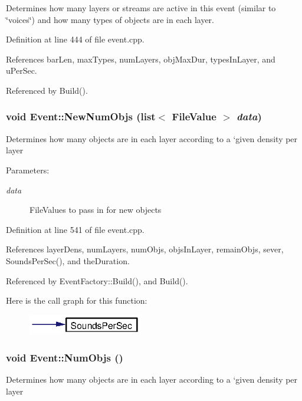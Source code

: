 Determines how many layers or streams are active in this event (similar to \char`\"{}voices\char`\"{}) and how many types of objects are in each layer. 

Definition at line 444 of file event.cpp.

References bar\-Len, max\-Types, num\-Layers, obj\-Max\-Dur, types\-In\-Layer, and u\-Per\-Sec.

Referenced by Build().
\subsubsection{\setlength{\rightskip}{0pt plus 5cm}void Event::New\-Num\-Objs (list$<$ {\bf File\-Value} $>$ {\em data})}\label{classEvent_a27}


Determines how many objects are in each layer according to a `given density per layer \begin{Desc}
\item[Parameters:]
\begin{description}
\item[{\em data}]File\-Values to pass in for new objects \end{description}
\end{Desc}


Definition at line 541 of file event.cpp.

References layer\-Dens, num\-Layers, num\-Objs, objs\-In\-Layer, remain\-Objs, sever, Sounds\-Per\-Sec(), and the\-Duration.

Referenced by Event\-Factory::Build(), and Build().

Here is the call graph for this function:\begin{figure}[H]
\begin{center}
\leavevmode
\includegraphics[width=141pt]{classEvent_a27_cgraph}
\end{center}
\end{figure}
\subsubsection{\setlength{\rightskip}{0pt plus 5cm}void Event::Num\-Objs ()}\label{classEvent_a26}


Determines how many objects are in each layer according to a `given density per layer 


